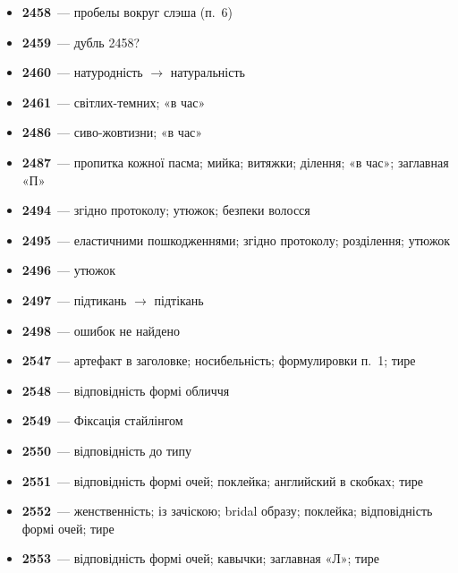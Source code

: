 \documentclass[11pt,a4paper]{article}
\begin{document}
\begin{itemize}[label=$\square$,leftmargin=*,itemsep=2pt]
  \item \textbf{2458}~— пробелы вокруг слэша (п.~6)
  \item \textbf{2459}~— дубль 2458?
  \item \textbf{2460}~— натуродність $\to$ натуральність
  \item \textbf{2461}~— світлих-темних; «в час»
  \item \textbf{2486}~— сиво-жовтизни; «в час»
  \item \textbf{2487}~— пропитка кожної пасма; мийка; витяжки; ділення; «в час»; заглавная «П»
  \item \textbf{2494}~— згідно протоколу; утюжок; безпеки волосся
  \item \textbf{2495}~— еластичними пошкодженнями; згідно протоколу; розділення; утюжок
  \item \textbf{2496}~— утюжок
  \item \textbf{2497}~— підтикань $\to$ підтікань
  \item \textbf{2498}~— ошибок не найдено
  \item \textbf{2547}~— артефакт в заголовке; носибельність; формулировки п.~1; тире
  \item \textbf{2548}~— відповідність формі обличчя
  \item \textbf{2549}~— Фіксація стайлінгом
  \item \textbf{2550}~— відповідність до типу
  \item \textbf{2551}~— відповідність формі очей; поклейка; английский в скобках; тире
  \item \textbf{2552}~— женственність; із зачіскою; bridal образу; поклейка; відповідність формі очей; тире
  \item \textbf{2553}~— відповідність формі очей; кавычки; заглавная «Л»; тире
\end{itemize}
\end{document}
